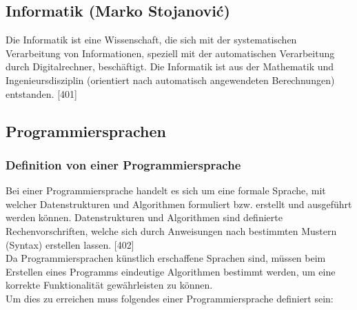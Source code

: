\documentclass[12pt,a4paper]{report}
\begin{document}
\begin{onehalfspace}
\chapter{Informatik (Marko Stojanovi\'{c})}

Die Informatik ist eine Wissenschaft, die sich mit der systematischen Verarbeitung von Informationen, speziell mit der automatischen Verarbeitung durch Digitalrechner, beschäftigt. Die Informatik ist aus der Mathematik und Ingenieursdisziplin (orientiert nach automatisch angewendeten Berechnungen) entstanden. [401]

\section{Programmiersprachen}

\subsection{Definition von einer Programmiersprache}
Bei einer Programmiersprache handelt es sich um eine formale Sprache, mit welcher Datenstrukturen und Algorithmen formuliert bzw. erstellt und ausgeführt werden können. Datenstrukturen und Algorithmen sind definierte Rechenvorschriften, welche sich durch Anweisungen nach bestimmten Mustern (Syntax) erstellen lassen. [402]\\

Da Programmiersprachen künstlich erschaffene Sprachen sind, müssen beim Erstellen eines Programms eindeutige Algorithmen bestimmt werden, um eine korrekte Funktionalität gewährleisten zu können.\\
Um dies zu erreichen muss folgendes einer Programmiersprache definiert sein:


\end{onehalfspace}
\end{document}
